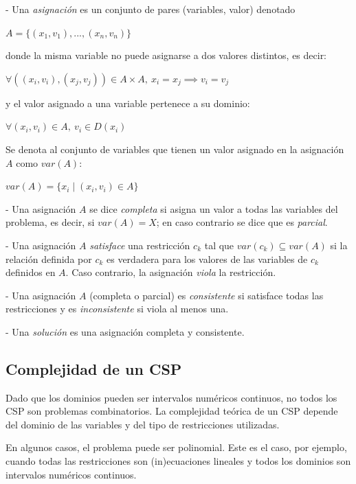 \documentclass{llncs}
\begin{document}
  	- Una \textit{asignación} es un conjunto de pares (variables, valor) denotado
  	\begin{center}
  		{$A = \{(x_1, v_1), ..., (x_n, v_n)\}$} 
  	\end{center}
  	donde la misma variable no puede asignarse a dos valores distintos, es decir:
  	\begin{center}
  		{$\forall((x_i, v_i), (x_j,v_j)) \in A \times A,\ x_i = x_j \implies v_i = v_j$}
  	\end{center}
  	y el valor asignado a una variable pertenece a su dominio:
  	\begin{center}
  		{$\forall(x_i, v_i) \in A,\ v_i \in D(x_i)$}
  	\end{center}
     Se denota al conjunto de variables que tienen un valor asignado en la asignación $A$ como
     $var(A)$:
     \begin{center}
     	$var(A) = \{x_i \mid (x_i, v_i) \in A\}$
     \end{center}
 
   - Una asignación $A$ se dice \textit{completa} si asigna un valor a todas las variables del
   problema, es decir, si $var(A) = X$; en caso contrario se dice que es \textit{parcial}.
   
   - Una asignación $A$ \textit{satisface} una restricción $c_k$ tal que $var(c_k) \subseteq var(A)$ si la relación definida por $c_k$ es verdadera para los valores de las variables de $c_k$ definidos en $A$. Caso contrario, la asignación \textit{viola} la restricción.
   
   - Una asignación $A$ (completa o parcial) es \textit{consistente} si satisface todas las restricciones y es \textit{inconsistente} si viola al menos una.
   
   - Una \textit{solución} es una asignación completa y consistente.
   
   \subsection{Complejidad de un CSP}
   \label{subsec:cspComplexity}
   	Dado que los dominios pueden ser intervalos numéricos continuos, no todos los CSP son
   	problemas combinatorios. La complejidad teórica de un CSP depende del dominio de las variables y del tipo de restricciones utilizadas.
   	
   	En algunos casos, el problema puede ser polinomial. Este es el caso, por ejemplo, cuando todas
   	las restricciones son (in)ecuaciones lineales y todos los dominios son intervalos numéricos
   	continuos.
   	
\end{document}
